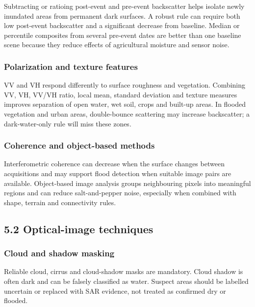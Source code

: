 \documentclass[11pt,a4paper]{article}
\begin{document}
Subtracting or ratioing post-event and pre-event backscatter helps isolate newly inundated areas from permanent dark surfaces. A robust rule can require both low post-event backscatter and a significant decrease from baseline. Median or percentile composites from several pre-event dates are better than one baseline scene because they reduce effects of agricultural moisture and sensor noise.

\subsubsection{Polarization and texture features}\label{polarization-and-texture-features}

VV and VH respond differently to surface roughness and vegetation. Combining VV, VH, VV/VH ratio, local mean, standard deviation and texture measures improves separation of open water, wet soil, crops and built-up areas. In flooded vegetation and urban areas, double-bounce scattering may increase backscatter; a dark-water-only rule will miss these zones.

\subsubsection{Coherence and object-based methods}\label{coherence-and-object-based-methods}

Interferometric coherence can decrease when the surface changes between acquisitions and may support flood detection when suitable image pairs are available. Object-based image analysis groups neighbouring pixels into meaningful regions and can reduce salt-and-pepper noise, especially when combined with shape, terrain and connectivity rules.

\subsection{5.2 Optical-image techniques}\label{optical-image-techniques}

\subsubsection{Cloud and shadow masking}\label{cloud-and-shadow-masking}

Reliable cloud, cirrus and cloud-shadow masks are mandatory. Cloud shadow is often dark and can be falsely classified as water. Suspect areas should be labelled uncertain or replaced with SAR evidence, not treated as confirmed dry or flooded.
\end{document}
